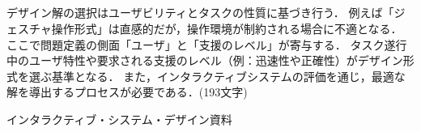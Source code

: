 \documentclass[titlepage,a4paper]{jsarticle}
\begin{document}
\subsection{ }
デザイン解の選択はユーザビリティとタスクの性質に基づき行う．
例えば「ジェスチャ操作形式」は直感的だが，操作環境が制約される場合に不適となる．
ここで問題定義の側面「ユーザ」と「支援のレベル」が寄与する．
タスク遂行中のユーザ特性や要求される支援のレベル（例：迅速性や正確性）がデザイン形式を選ぶ基準となる．
また，インタラクティブシステムの評価を通じ，最適な解を導出するプロセスが必要である．(193文字)
\begin{thebibliography}{99}
  インタラクティブ・システム・デザイン資料
\end{thebibliography}
\end{document}
